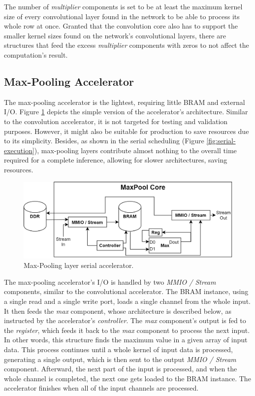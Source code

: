 The number of \emph{multiplier} components is set to be at least the maximum kernel size of every convolutional layer found in the network to be able to process its whole row at once. Granted that the convolution core also has to support the smaller kernel sizes found on the network's convolutional layers, there are structures that feed the excess \emph{multiplier} components with zeros to not affect the computation's result.

\subsection{Max-Pooling Accelerator}
The max-pooling accelerator is the lightest, requiring little BRAM and external I/O. Figure \ref{fig:max-pool-core-serial} depicts the simple version of the accelerator's architecture. Similar to the convolution accelerator, it is not targeted for testing and validation purposes. However, it might also be suitable for production to save resources due to its simplicity. Besides, as shown in the serial scheduling (Figure \ref{fig:serial-execution}), max-pooling layers contribute almost nothing to the overall time required for a complete inference, allowing for slower architectures, saving resources.

\begin{figure} [H]
	\centering
	\includegraphics[width=\textwidth]{Images/Platform/MaxPool_core_serial.png}
	\decoRule
	\caption[Max-Pooling layer serial accelerator]{Max-Pooling layer serial accelerator.}
	\label{fig:max-pool-core-serial}
\end{figure}

The max-pooling accelerator's I/O is handled by two \emph{MMIO / Stream} components, similar to the convolutional accelerator. The BRAM instance, using a single read and a single write port, loads a single channel from the whole input. It then feeds the \emph{max} component, whose architecture is described below, as instructed by the accelerator's \emph{controller}. The \emph{max} component's output is fed to the \emph{register}, which feeds it back to the \emph{max} component to process the next input. In other words, this structure finds the maximum value in a given array of input data. This process continues until a whole kernel of input data is processed, generating a single output, which is then sent to the output \emph{MMIO / Stream} component. Afterward, the next part of the input is processed, and when the whole channel is completed, the next one gets loaded to the BRAM instance. The accelerator finishes when all of the input channels are processed.


